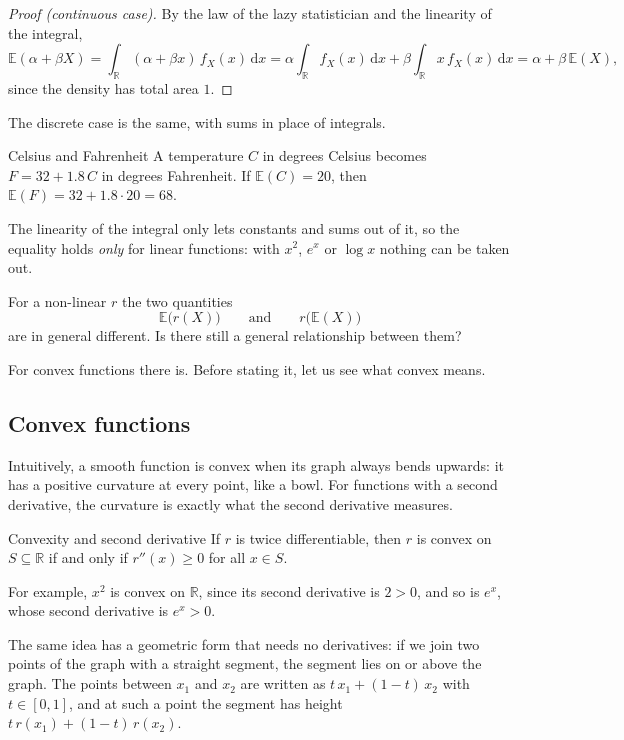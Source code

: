 \documentclass[a4paper,12pt,oneside]{report}
\begin{document}
\begin{proof}[Proof (continuous case)]
By the law of the lazy statistician and the linearity of the integral,
\[
\mathbb{E}(\alpha+\beta X)=\int_{\mathbb{R}}(\alpha+\beta x)\,f_X(x)\,\mathrm{d}x
=\alpha\int_{\mathbb{R}}f_X(x)\,\mathrm{d}x+\beta\int_{\mathbb{R}}x\,f_X(x)\,\mathrm{d}x
=\alpha+\beta\,\mathbb{E}(X),
\]
since the density has total area $1$.
\end{proof}

The discrete case is the same, with sums in place of integrals.

\begin{framedexample}{Celsius and Fahrenheit}
A temperature $C$ in degrees Celsius becomes $F=32+1.8\,C$ in degrees
Fahrenheit. If $\mathbb{E}(C)=20$, then $\mathbb{E}(F)=32+1.8\cdot20=68$.
\end{framedexample}

The linearity of the integral only lets constants and sums out of it, so the
equality holds \emph{only} for linear functions: with $x^2$, $e^x$ or
$\log x$ nothing can be taken out.

For a non-linear $r$ the two quantities
\[
\mathbb{E}\big(r(X)\big)\qquad\text{and}\qquad r\big(\mathbb{E}(X)\big)
\]
are in general different. Is there still a general relationship between them?

For convex functions there is. Before stating it, let us see what convex
means.

\subsection{Convex functions}

Intuitively, a smooth function is convex when its graph always bends
upwards: it has a positive curvature at every point, like a bowl. For
functions with a second derivative, the curvature is exactly what the
second derivative measures.

\begin{framedprop}{Convexity and second derivative}
If $r$ is twice differentiable, then $r$ is convex on $S\subseteq\mathbb{R}$
if and only if $r''(x)\ge0$ for all $x\in S$.
\end{framedprop}

For example, $x^2$ is convex on $\mathbb{R}$, since its second derivative is
$2>0$, and so is $e^x$, whose second derivative is $e^x>0$.

The same idea has a geometric form that needs no derivatives: if we join
two points of the graph with a straight segment, the segment lies on or
above the graph. The points between $x_1$ and $x_2$ are written as
$t\,x_1+(1-t)\,x_2$ with $t\in[0,1]$, and at such a point the segment has
height $t\,r(x_1)+(1-t)\,r(x_2)$.
\end{document}
